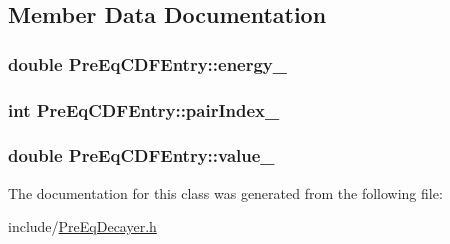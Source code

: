 \subsection{Member Data Documentation}
\hypertarget{classPreEqCDFEntry_a59bcfcf73dfbcc3af62cdbd85b3299dc}{
\subsubsection[{energy\-\_\-}]{\setlength{\rightskip}{0pt plus 5cm}double Pre\-Eq\-C\-D\-F\-Entry\-::energy\-\_\-}}\label{classPreEqCDFEntry_a59bcfcf73dfbcc3af62cdbd85b3299dc}
\hypertarget{classPreEqCDFEntry_a26ae0cab9ef4a3cea18e5fcdd9a95219}{
\subsubsection[{pair\-Index\-\_\-}]{\setlength{\rightskip}{0pt plus 5cm}int Pre\-Eq\-C\-D\-F\-Entry\-::pair\-Index\-\_\-}}\label{classPreEqCDFEntry_a26ae0cab9ef4a3cea18e5fcdd9a95219}
\hypertarget{classPreEqCDFEntry_ab45f5e96c71a4f89a19bd9f0b4160fb8}{
\subsubsection[{value\-\_\-}]{\setlength{\rightskip}{0pt plus 5cm}double Pre\-Eq\-C\-D\-F\-Entry\-::value\-\_\-}}\label{classPreEqCDFEntry_ab45f5e96c71a4f89a19bd9f0b4160fb8}


The documentation for this class was generated from the following file\-:\begin{DoxyCompactItemize}
\item 
include/\hyperlink{PreEqDecayer_8h}{Pre\-Eq\-Decayer.\-h}\end{DoxyCompactItemize}
